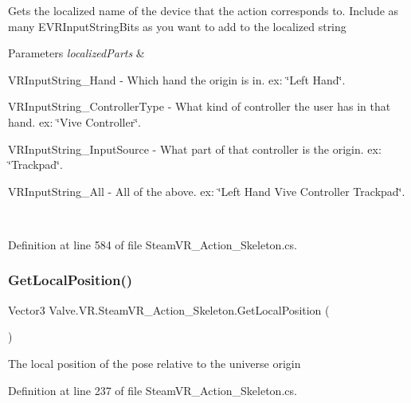 Gets the localized name of the device that the action corresponds to. Include as many E\+V\+R\+Input\+String\+Bits as you want to add to the localized string 


\begin{DoxyParams}{Parameters}
{\em localized\+Parts} & 
\begin{DoxyItemize}
\item V\+R\+Input\+String\+\_\+\+Hand -\/ Which hand the origin is in. ex\+: \char`\"{}\+Left Hand\char`\"{}.  
\item V\+R\+Input\+String\+\_\+\+Controller\+Type -\/ What kind of controller the user has in that hand. ex\+: \char`\"{}\+Vive Controller\char`\"{}.  
\item V\+R\+Input\+String\+\_\+\+Input\+Source -\/ What part of that controller is the origin. ex\+: \char`\"{}\+Trackpad\char`\"{}.  
\item V\+R\+Input\+String\+\_\+\+All -\/ All of the above. ex\+: \char`\"{}\+Left Hand Vive Controller Trackpad\char`\"{}.  
\end{DoxyItemize}\\
\hline
\end{DoxyParams}


Definition at line 584 of file Steam\+V\+R\+\_\+\+Action\+\_\+\+Skeleton.\+cs.

\mbox{\label{class_valve_1_1_v_r_1_1_steam_v_r___action___skeleton_abb7252a97f4108bda5915954c10f32a7}} 
\subsubsection{\texorpdfstring{GetLocalPosition()}{GetLocalPosition()}}
{\footnotesize\ttfamily Vector3 Valve.\+V\+R.\+Steam\+V\+R\+\_\+\+Action\+\_\+\+Skeleton.\+Get\+Local\+Position (\begin{DoxyParamCaption}{ }\end{DoxyParamCaption})}



The local position of the pose relative to the universe origin 



Definition at line 237 of file Steam\+V\+R\+\_\+\+Action\+\_\+\+Skeleton.\+cs.

